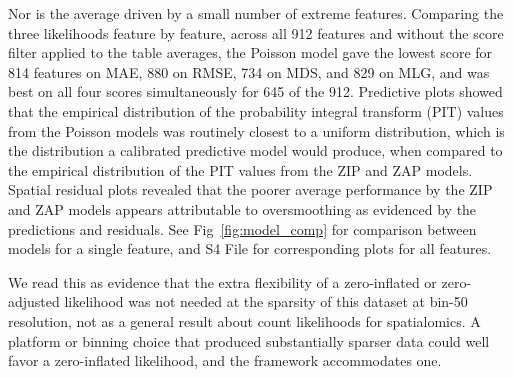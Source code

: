 \documentclass[10pt,letterpaper]{article}
\begin{document}
Nor is the average driven by a small number of extreme features. Comparing the three likelihoods feature by feature, across all 912 features and without the score filter applied to the table averages, the Poisson model gave the lowest score for 814 features on MAE, 880 on RMSE, 734 on MDS, and 829 on MLG, and was best on all four scores simultaneously for 645 of the 912. Predictive plots showed that the empirical distribution of the probability integral transform (PIT) values from the Poisson models was routinely closest to a uniform distribution, which is the distribution a calibrated predictive model would produce, when compared to the empirical distribution of the PIT values from the ZIP and ZAP models. Spatial residual plots revealed that the poorer average performance by the ZIP and ZAP models appears attributable to oversmoothing as evidenced by the predictions and residuals. See Fig~\ref{fig:model_comp} for comparison between models for a single feature, and S4 File for corresponding plots for all features.

We read this as evidence that the extra flexibility of a zero-inflated or zero-adjusted likelihood was not needed at the sparsity of this dataset at bin-50 resolution, not as a general result about count likelihoods for spatialomics. A platform or binning choice that produced substantially sparser data could well favor a zero-inflated likelihood, and the framework accommodates one.
\end{document}
